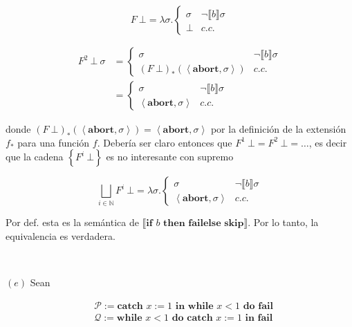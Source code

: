 \documentclass[a4paper, 12pt]{article}
\begin{document}
\begin{equation*}
  F ~ \bot = \lambda \sigma . \begin{cases}
    \sigma & \neg\llbracket b \rrbracket\sigma \\ 
    \bot &c.c.
  \end{cases}
\end{equation*}

\begin{align*}
  F^2 ~ \bot ~ \sigma
  &= \begin{cases}
    \sigma & \neg \llbracket b \rrbracket\sigma \\ 
    (F ~ \bot )_* \left( \left<\textbf{abort}, \sigma \right> \right) &c.c.
  \end{cases} \\ 
  &=\begin{cases}
    \sigma & \neg \llbracket  b \rrbracket\sigma \\ 
    \left<\textbf{abort}, \sigma \right> &c.c.
  \end{cases}
\end{align*}

donde $(F ~ \bot )_*\left( \left<\textbf{abort},\sigma \right> \right) =
\left<\textbf{abort}, \sigma \right>$ por la definición de la extensión $f_*$
para una función $f$. Debería ser claro entonces que $F^1 ~ \bot  = F^2 ~ \bot =
\ldots$, es decir que la cadena $\left\{ F^i ~ \bot  \right\} $ es no
interesante con supremo 

\begin{equation*}
  \bigsqcup_{i \in \mathbb{N}} F^i ~ \bot = \lambda \sigma . \begin{cases}
    \sigma & \neg \llbracket b \rrbracket\sigma \\ 
    \left<\textbf{abort}, \sigma \right> &c.c.
  \end{cases} 
\end{equation*}

Por def. esta es la semántica de $\llbracket \textbf{if } b \textbf{ then } \textbf{fail} \textbf{
  else } \textbf{skip} \rrbracket$. Por lo tanto, la equivalencia es verdadera.


  ~


$(e)$ Sean

\begin{align*}
  &\mathcal{P} := \textbf{catch } x := 1 \textbf{ in } \textbf{while } x < 1
  \textbf{ do } \textbf{fail}\\ 
  &\mathcal{Q} := \textbf{while } x < 1 \textbf{ do } \textbf{catch } x:= 1
  \textbf{ in fail}
\end{align*}
\end{document}

